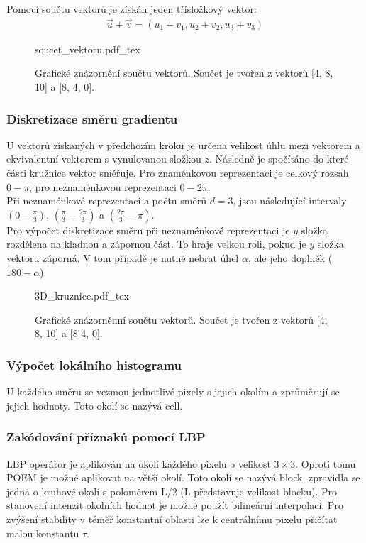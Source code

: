 \documentclass[czech,BP]{thesiskiv}
\begin{document}
Pomocí součtu vektorů je získán jeden třísložkový vektor:
\begin{align}
   \label{soucet_vektrou} \vec{u} + \vec{v} = (u_1 + v_1, u_2 + v_2, u_3 + v_3 )
\end{align} 

\begin{figure}[ht]
    \centering
    \def\svgwidth{\columnwidth}
    {soucet_vektoru.pdf_tex} 
    \caption{Grafické znázornění součtu vektorů. Součet je tvořen z vektorů [4, 8, 10] a [8, 4, 0].}
\end{figure}

\subsubsection{Diskretizace směru gradientu}
U vektorů získaných v předchozím kroku je určena velikost úhlu mezi vektorem a ekvivalentní vektorem s vynulovanou složkou $z$. Následně je spočítáno do které části kružnice vektor směřuje. Pro znaménkovou reprezentaci je celkový rozsah $0 - \pi$, pro neznaménkovou reprezentaci $0 - 2\pi$.
\\
Při neznaménkové reprezentaci a počtu směrů $d = 3$, jsou následující intervaly $\left(0 - \frac{\pi}{3}\right)$, $\left(\frac{\pi}{3} - \frac{2\pi}{3}\right)$ a  $\left(\frac{2\pi}{3} - \pi\right)$.
\\
Pro výpočet diskretizace směru při neznaménkové reprezentaci je $y$ složka rozdělena na kladnou a zápornou část. To hraje velkou roli, pokud je $y$ složka vektoru záporná. V tom případě je nutné nebrat úhel $\alpha$, ale jeho doplněk ($ 180 - \alpha$).

\begin{figure}[ht]
    \centering
    \def\svgwidth{\columnwidth}
    {3D_kruznice.pdf_tex} 
    \caption{Grafické znázorněnní součtu vektorů. Součet je tvořen z vektorů [4, 8, 10] a [8 4, 0].}
\end{figure}

\subsubsection{Výpočet lokálního histogramu}
U každého směru  se vezmou jednotlivé pixely s jejich okolím a zprůměrují se jejich hodnoty. Toto okolí se nazývá cell. \\

\subsubsection{Zakódování příznaků pomocí LBP}
LBP operátor je aplikován na okolí každého pixelu o velikost $3 \times 3$. Oproti tomu POEM je možné aplikovat na větší okolí. Toto okolí se nazývá block, zpravidla se jedná o kruhové okolí s poloměrem L/2 (L představuje velikost blocku). Pro stanovení intenzit okolních hodnot je možné použít bilineární interpolaci. Pro zvýšení stability v téměř konstantní oblasti lze k centrálnímu pixelu přičítat malou konstantu $\tau$.
\end{document}
